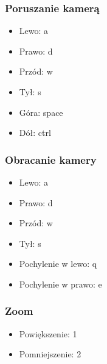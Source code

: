 \documentclass[11pt]{article}
\begin{document}
\subsubsection{Poruszanie kamerą}
    \begin{itemize}
        \item Lewo: a
        \item Prawo: d
        \item Przód: w
        \item Tył: s
        \item Góra: space
        \item Dół: ctrl
    \end{itemize}
\subsubsection{Obracanie kamery}
    \begin{itemize}
        \item Lewo: a
        \item Prawo: d
        \item Przód: w
        \item Tył: s
        \item Pochylenie w lewo: q
        \item Pochylenie w prawo: e
    \end{itemize}
\subsubsection{Zoom}
    \begin{itemize}
        \item Powiększenie: 1
        \item Pomniejszenie: 2
    \end{itemize}
\end{document}
